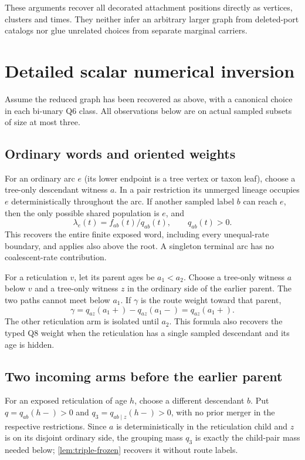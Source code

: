 \documentclass[11pt]{article}
\begin{document}
These arguments recover all decorated attachment positions directly as vertices, clusters and times. They neither infer an arbitrary larger graph from deleted-port catalogs nor glue unrelated choices from separate marginal carriers.

\section{Detailed scalar numerical inversion}
\label{sec:numeric}
Assume the reduced graph has been recovered as above, with a canonical choice in each bi-unary Q6 class. All observations below are on actual sampled subsets of size at most three.

\subsection{Ordinary words and oriented weights}
For an ordinary arc $e$ (its lower endpoint is a tree vertex or taxon leaf), choose a tree-only descendant witness $a$. In a pair restriction its unmerged lineage occupies $e$ deterministically throughout the arc. If another sampled label $b$ can reach $e$, then the only possible shared population is $e$, and
\[
 \lambda_e(t)=f_{ab}(t)/q_{ab}(t),\qquad q_{ab}(t)>0.
\]
This recovers the entire finite exposed word, including every unequal-rate boundary, and applies also above the root. A singleton terminal arc has no coalescent-rate contribution.

For a reticulation $v$, let its parent ages be $a_1<a_2$. Choose a tree-only witness $a$ below $v$ and a tree-only witness $z$ in the ordinary side of the earlier parent. The two paths cannot meet below $a_1$. If $\gamma$ is the route weight toward that parent,
\[
 \gamma=q_{az}(a_1+)-q_{az}(a_1-)=q_{az}(a_1+).
\]
The other reticulation arm is isolated until $a_2$. This formula also recovers the typed Q8 weight when the reticulation has a single sampled descendant and its age is hidden.

\subsection{Two incoming arms before the earlier parent}
For an exposed reticulation of age $h$, choose a different descendant $b$. Put $q=q_{ab}(h-)>0$ and $q_3=q_{ab\mid z}(h-)>0$, with no prior merger in the respective restrictions. Since $a$ is deterministically in the reticulation child and $z$ is on its disjoint ordinary side, the grouping mass $q_3$ is exactly the child-pair mass needed below; \cref{lem:triple-frozen} recovers it without route labels.
\end{document}
